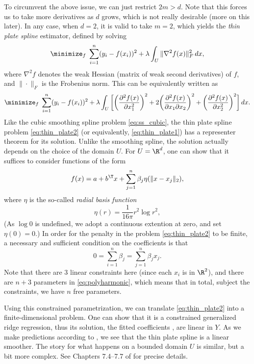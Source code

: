 \documentclass{article}
\begin{document}
To circumvent the above issue, we can just restrict $2m > d$. Note that this
forces us to take more derivatives as $d$ grows, which is not really desirable
(more on this later). In any case, when $d=2$, it is valid to take $m=2$, which
yields the \emph{thin plate spline} estimator, defined by solving   
\begin{equation}
\label{eq:thin_plate1}
\minimize_f \; \sum_{i=1}^n (y_i - f(x_i))^2 + \lambda \int_U \|\nabla^2 
f(x)\|_F^2 \, dx, 
\end{equation}
where $\nabla^2 f$ denotes the weak Hessian (matrix of weak second derivatives)
of $f$, and $\|\cdot\|_F$ is the Frobenius norm. This can be equivalently
written as  
\begin{equation}
\label{eq:thin_plate2}
\minimize_f \; \sum_{i=1}^n (y_i - f(x_i))^2 + \lambda \int_U \bigg[ \bigg( 
\frac{\partial^2 f(x)}{\partial x_1^2}\bigg)^2 +  2\bigg( \frac{\partial^2
  f(x)}{\partial x_1 \partial x_2} \bigg)^2 +  \bigg( \frac{\partial^2
  f(x)}{\partial x_2^2} \bigg)^2 \bigg] \, dx. 
\end{equation}
Like the cubic smoothing spline problem \eqref{eq:ss_cubic}, the thin plate
spline problem \eqref{eq:thin_plate2} (or equivalently, \eqref{eq:thin_plate1}) 
has a representer theorem for its solution. Unlike the smoothing spline, the
solution actually depends on the choice of the domain $U$. For $U = \R^d$,  
one can show that it suffices to consider functions of the form   
\begin{equation} 
\label{eq:polyharmonic}
f(x) = a + b^\T x + \sum_{j=1}^n \beta_j \eta(\|x - x_j\|_2), 
\end{equation}
where $\eta$ is the so-called \emph{radial basis function}
\[
\eta(r) = \frac{1}{16 \pi} r^2 \log r^2,
\]
(As $\log 0$ is undefined, we adopt a continuous extention at zero, and set
$\eta(0) = 0$.) In order for the penalty in the problem \eqref{eq:thin_plate2}
to be finite, a necessary and sufficient condition on the coefficients is that 
\[
0 = \sum_{i=1}^n \beta_j = \sum_{j=1}^n \beta_j x_j.
\]
Note that there are 3 linear constraints here (since each $x_i$ is in $\R^2$), 
and there are $n+3$ parameters in \eqref{eq:polyharmonic}, which means that in
total, subject the constraints, we have $n$ free parameters.  

Using this constrained parametrization, we can translate \eqref{eq:thin_plate2}
into a finite-dimensional problem. One can show that it is a constrained
generalized ridge regression, thus its solution, the fitted coefficients
, are linear in $Y$. As we make predictions
according to , we see that the thin plate spline is a linear smoother.
The story for what happens on a bounded domain $U$ is similar, but a bit more
complex. See Chapters 7.4--7.7 of \citet{green1993nonparametric} for precise
details.      
\end{document}
